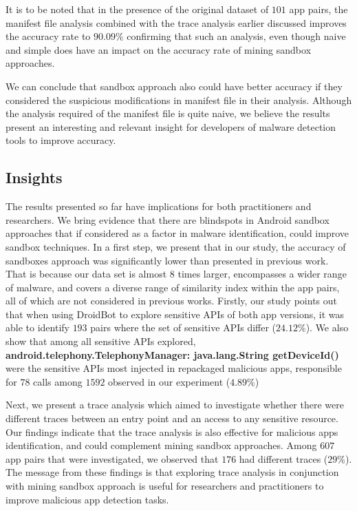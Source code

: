 It is to be noted that in the presence of the original dataset of $101$ app pairs, the manifest file analysis combined with the trace analysis earlier discussed improves the accuracy rate to $90.09\%$ confirming that such an analysis, even though naive and simple does have an impact on the accuracy rate of mining sandbox approaches.  %


\begin{obs}{3}{}
 We can conclude that sandbox approach also could have better accuracy if they considered the suspicious modifications in manifest file in their analysis. Although the analysis required of the manifest file is quite naive, we believe the results present an interesting and relevant insight for developers of malware detection tools to improve accuracy.
\end{obs}

\subsection{Insights}\label{sec:implications} 

The results presented so far have implications for both practitioners and researchers. We bring evidence that there are blindspots in Android sandbox approaches that if considered as a factor in malware identification, could improve sandbox techniques. In a first step, we present that in our study, the accuracy of sandboxes approach was significantly lower than presented in previous work. That is because our data set is almost $8$ times larger, encompasses a wider range of malware, and covers a diverse range of similarity index within the app pairs, all of which are not considered in previous works. Firstly, our study points out that when using DroidBot to explore sensitive APIs of both app versions, it was able to identify $193$ pairs where the set of sensitive APIs differ ($24.12$\%). We also show that among all sensitive APIs explored, \textbf{android.telephony.TelephonyManager: java.lang.String getDeviceId()} were the sensitive APIs most injected in repackaged malicious apps, responsible for $78$ calls among $1592$ observed in our experiment ($4.89\%$)

Next, we present a trace analysis which aimed to investigate whether there were different traces between an entry point and an access to any sensitive resource. Our findings indicate that the trace analysis is also effective for malicious apps identification, and could complement mining sandbox approaches. Among $607$ app pairs that were investigated, we observed that $176$ had different traces ($29\%$). The message from these findings is that exploring trace analysis in conjunction with mining sandbox approach is useful for researchers and practitioners to improve malicious app detection tasks. 

